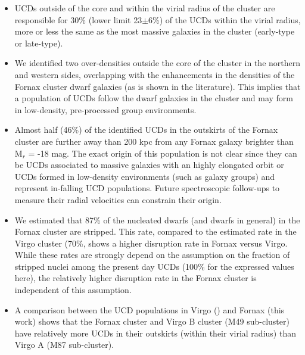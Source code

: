 \documentclass[fleqn,usenatbib]{mnras}
\begin{document}
\begin{itemize}

\item UCDs outside of the core and within the virial radius of the cluster are responsible for 30\% (lower limit 23$\pm$6\%) of the UCDs within the virial radius, more or less the same as the most massive galaxies in the cluster (early-type or late-type). \\

\item We identified two over-densities outside the core of the cluster in the northern and western sides, overlapping with the enhancements in the densities of the Fornax cluster dwarf galaxies (as is shown in the literature). This implies that a population of UCDs follow the dwarf galaxies in the cluster and may form in low-density, pre-processed group environments. \\

\item Almost half (46\%) of the identified UCDs in the outskirts of the Fornax cluster are further away than 200 kpc from any Fornax galaxy brighter than M$_r$ = -18 mag. The exact origin of this population is not clear since they can be UCDs associated to massive galaxies with an highly elongated orbit or UCDs formed in low-density environments (such as galaxy groups) and represent in-falling UCD populations. Future spectroscopic follow-ups to measure their radial velocities can constrain their origin. \\

\item We estimated that 87\% of the nucleated dwarfs (and dwarfs in general) in the Fornax cluster are stripped. This rate, compared to the estimated rate in the Virgo cluster (70\%, \citealp{Ferrarese} shows a higher disruption rate in Fornax versus Virgo. While these rates are strongly depend on the assumption on the fraction of stripped nuclei among the present day UCDs (100\% for the expressed values here), the relatively higher disruption rate in the Fornax cluster is independent of this assumption.\\

\item A comparison between the UCD populations in Virgo (\citealp{Liu-2020}) and Fornax (this work) shows that the Fornax cluster and Virgo B cluster (M49 sub-cluster) have relatively more UCDs in their outskirts (within their virial radius) than Virgo A (M87 sub-cluster).
\end{itemize}
\end{document}
